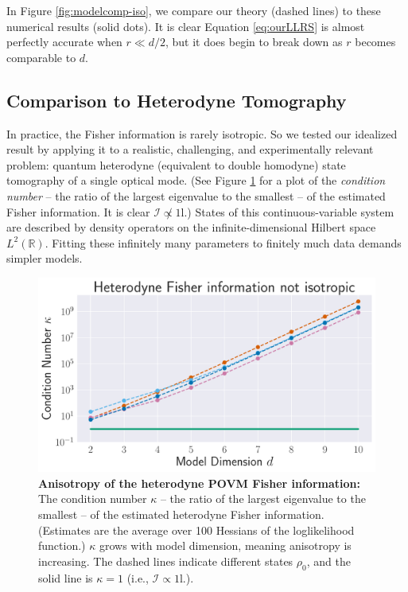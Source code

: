 \documentclass[aps,pra, twocolumn]{revtex4-1}
\newcommand{\reals}{\mathbb{R}}
\newcommand{\Id}{\mathbb{I}}
\def\Id{1\!\mathrm{l}}
\begin{document}
In Figure \ref{fig:modelcomp-iso}, we compare our theory (dashed lines) to these numerical results (solid dots).  It is clear Equation \eqref{eq:ourLLRS} is almost perfectly accurate when $r \ll d/2$, but it does begin to break down as $r$ becomes comparable to $d$.


\subsection{Comparison to Heterodyne Tomography}
\label{sec:heterotomo}
In practice, the Fisher information is rarely isotropic.  So we tested our idealized result by applying it to a realistic, challenging, and experimentally relevant problem: quantum heterodyne (equivalent to double homodyne) state tomography \cite{Lvovsky2001a, Bertrand1987, Leonhardt1995, Lvovsky2009} of a single optical mode.  (See Figure \ref{fig:fish_condition} for a plot of the \emph{condition number} -- the ratio of the largest eigenvalue to the smallest -- of the estimated Fisher information. It is clear $\mathcal{I} \not \propto \Id$.) States of this continuous-variable system are described by density operators on the infinite-dimensional Hilbert space $L^2(\reals)$.  Fitting these infinitely many parameters to finitely much data demands simpler models.

\begin{figure}
  \includegraphics[width=.9\columnwidth]{Images/Figure_10.pdf}
 \caption{\textbf{Anisotropy of the heterodyne POVM Fisher information:} The condition number $\kappa$ -- the ratio of the largest eigenvalue to the smallest -- of the estimated heterodyne Fisher information. (Estimates are the average over 100 Hessians of the loglikelihood function.) $\kappa$ grows with model dimension, meaning anisotropy is increasing.  The dashed lines indicate different states $\rho_{0}$, and the solid line is $\kappa = 1$ (i.e., $\mathcal{I} \propto \Id$.).}
\label{fig:fish_condition}
\end{figure}
\end{document}
